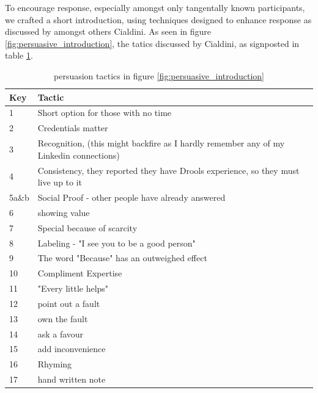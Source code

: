 To encourage response, especially amongst only tangentally known participants, we crafted a short introduction, using techniques designed to enhance response as discussed by amongst others Cialdini\cite{goldstein2008yes}.
As seen in figure \ref{fig:persuasive_introduction}, the tatics discussed by Cialdini, as signposted in table \ref{table:persuasive_introduction}.
\begin{table}[h]
    \begin{center}
        \begin{tabular}{ |l | l |  } 
            \hline
            Key &  Tactic\\
            \hline
            1  & Short option for those with no time \\
            2  & Credentials matter \\
            3  & Recognition, (this might backfire as I hardly remember any of my Linkedin connections) \\
            4  & Consistency, they reported they have Drools experience, so they must live up to it \\
            5a\&b  & Social Proof - other people have already answered \\
            6  & showing value \\
            7  & Special because of scarcity \\
            8  & Labeling - "I see you to be a good person" \\
            9  & The word "Because" has an outweighed effect \\
            10 & Compliment Expertise \\
            11 & "Every little helps" \\
            12 & point out a fault \\
            13 & own the fault \\
            14 & ask a favour \\
            15 & add inconvenience \\
            16 & Rhyming \\
            17 & hand written note \\
            \hline
        \end{tabular}
    \end{center}
    \caption{persuasion tactics in figure \ref{fig:persuasive_introduction}}
    \label{table:persuasive_introduction}
\end{table}

